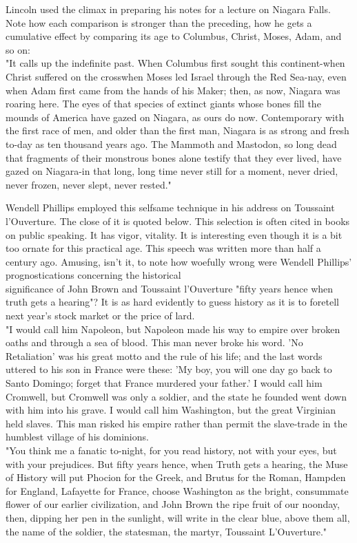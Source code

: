 \documentclass[10pt]{article}
\begin{document}
Lincoln used the climax in preparing his notes for a lecture on Niagara Falls. Note how each comparison is stronger than the preceding, how he gets a cumulative effect by comparing its age to Columbus, Christ, Moses, Adam, and so on:\\
"It calls up the indefinite past. When Columbus first sought this continent-when Christ suffered on the crosswhen Moses led Israel through the Red Sea-nay, even when Adam first came from the hands of his Maker; then, as now, Niagara was roaring here. The eyes of that species of extinct giants whose bones fill the mounds of America have gazed on Niagara, as ours do now. Contemporary with the first race of men, and older than the first man, Niagara is as strong and fresh to-day as ten thousand years ago. The Mammoth and Mastodon, so long dead that fragments of their monstrous bones alone testify that they ever lived, have gazed on Niagara-in that long, long time never still for a moment, never dried, never frozen, never slept, never rested."

Wendell Phillips employed this selfsame technique in his address on Toussaint l'Ouverture. The close of it is quoted below. This selection is often cited in books on public speaking. It has vigor, vitality. It is interesting even though it is a bit too ornate for this practical age. This speech was written more than half a century ago. Amusing, isn't it, to note how woefully wrong were Wendell Phillips' prognostications concerning the historical\\
significance of John Brown and Toussaint l'Ouverture "fifty years hence when truth gets a hearing"? It is as hard evidently to guess history as it is to foretell next year's stock market or the price of lard.\\
"I would call him Napoleon, but Napoleon made his way to empire over broken oaths and through a sea of blood. This man never broke his word. 'No Retaliation' was his great motto and the rule of his life; and the last words uttered to his son in France were these: 'My boy, you will one day go back to Santo Domingo; forget that France murdered your father.' I would call him Cromwell, but Cromwell was only a soldier, and the state he founded went down with him into his grave. I would call him Washington, but the great Virginian held slaves. This man risked his empire rather than permit the slave-trade in the humblest village of his dominions.\\
"You think me a fanatic to-night, for you read history, not with your eyes, but with your prejudices. But fifty years hence, when Truth gets a hearing, the Muse of History will put Phocion for the Greek, and Brutus for the Roman, Hampden for England, Lafayette for France, choose Washington as the bright, consummate flower of our earlier civilization, and John Brown the ripe fruit of our noonday, then, dipping her pen in the sunlight, will write in the clear blue, above them all, the name of the soldier, the statesman, the martyr, Toussaint L'Ouverture."
\end{document}
